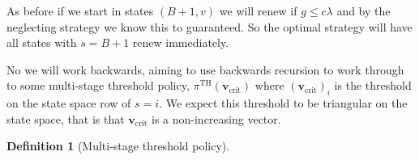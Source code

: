 \documentclass[a4paper,10pt]{article}
\theoremstyle{definition}
\newtheorem{definition}[theorem]{Definition}
\theoremstyle{definition}
\theoremstyle{remark}
\theoremstyle{definition}
\begin{document}
As before if we start in states $(B+1,v)$ we will renew if $g \leq c \lambda$ and by the neglecting strategy we know this to guaranteed. So the optimal strategy will have all states with $s=B+1$ renew immediately.

No we will work backwards, aiming to use backwards recursion to work through to some multi-stage threshold policy, $\pi^{\text{TH}}(\bm{v}_{\text{crit}})$ where $(\bm{v}_{\text{crit}})_{i}$ is the threshold on the state space row of $s=i$. We expect this threshold to be triangular on the state space, that is that $\bm{v}_{\text{crit}}$ is a non-increasing vector.

\begin{definition}[Multi-stage threshold policy]

\end{definition}
\end{document}
